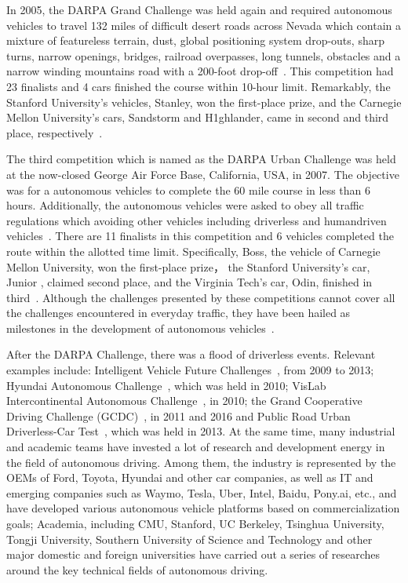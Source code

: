 \documentclass[conference]{IEEEtran}
\begin{document}
In 2005, the DARPA Grand Challenge was held again and required autonomous vehicles to travel 132 miles of difficult desert roads across Nevada which contain a mixture of featureless terrain, dust, global positioning system drop-outs, sharp turns, narrow openings, bridges, railroad overpasses, long tunnels, obstacles and a narrow winding mountains road with a 200-foot drop-off~\cite{Buehler2007}. This competition had 23 finalists and 4 cars finished the course within 10-hour limit. Remarkably, the Stanford University's vehicles, Stanley, won the first-place prize, and the Carnegie Mellon University's cars, Sandstorm and H1ghlander, came in second and third place, respectively~\cite{Buehler2007}.

The third competition which is named as the DARPA Urban Challenge was held at the now-closed George Air Force Base, California, USA, in 2007. The objective was for a autonomous vehicles to complete the 60 mile course in less than 6 hours. Additionally, the autonomous vehicles were asked to obey all traffic regulations which avoiding other vehicles including driverless and humandriven vehicles~\cite{buehler2009darpa}. There are 11 finalists in this competition and 6 vehicles completed the route within the allotted time limit. Specifically, Boss, the vehicle of Carnegie Mellon University, won the first-place prize， the Stanford University's car, Junior , claimed second place, and the Virginia Tech's car, Odin, finished in third~\cite{buehler2009darpa}. Although the challenges presented by these competitions cannot cover all the challenges encountered in everyday traffic, they have been hailed as milestones in the development of autonomous vehicles~\cite{Brian2016}.

After the DARPA Challenge, there was a flood of driverless events. Relevant examples include: Intelligent Vehicle Future Challenges~\cite{xin2014china}, from 2009 to 2013; Hyundai Autonomous Challenge~\cite{Cerri2011}, which was held in 2010; VisLab Intercontinental Autonomous Challenge~\cite{broggi2012vislab}, in 2010; the Grand Cooperative Driving Challenge (GCDC)~\cite{Englund2016}, in 2011 and 2016 and Public Road Urban Driverless-Car Test~\cite{Broggi2015}, which was held in 2013. At the same time, many industrial and academic teams have invested a lot of research and development energy in the field of autonomous driving. Among them, the industry is represented by the OEMs of Ford, Toyota, Hyundai and other car companies, as well as IT and emerging companies such as Waymo, Tesla, Uber, Intel, Baidu, Pony.ai, etc., and have developed various autonomous vehicle platforms based on commercialization goals; Academia, including CMU, Stanford, UC Berkeley, Tsinghua University, Tongji University, Southern University of Science and Technology and other major domestic and foreign universities have carried out a series of researches around the key technical fields of autonomous driving.
\end{document}
